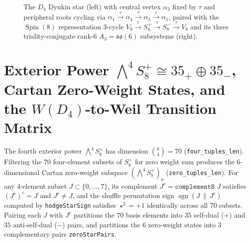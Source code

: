 \documentclass[11pt,a4paper]{article}
\begin{document}
\begin{figure}[htbp]
{%
  }
  \caption{The $D_4$ Dynkin star (left) with central vertex $\alpha_2$ fixed by $\tau$ and peripheral roots cycling via $\alpha_1 \xrightarrow{\tau} \alpha_4 \xrightarrow{\tau} \alpha_3 \xrightarrow{\tau} \alpha_1$, paired with the $\operatorname{Spin}(8)$ representation $3$-cycle $V_8 \xrightarrow{\tau} S^+_8 \xrightarrow{\tau} S^-_8 \xrightarrow{\tau} V_8$ and its three triality-conjugate rank-$6$ $A_3 = \mathfrak{so}(6)$ subsystems (right).}
  \label{fig:d4_dynkin_triality}
\end{figure}

\section{Exterior Power \texorpdfstring{$\bigwedge^4 S^+_8 \cong 35_+ \oplus 35_-$}{Wedge4(S+8) = 35+ + 35-}, Cartan Zero-Weight States, and the \texorpdfstring{$W(D_4)$}{W(D4)}-to-Weil Transition Matrix}

The fourth exterior power $\bigwedge^4 S^+_8$ has dimension $\binom{8}{4} = 70$ (\texttt{four\_tuples\_len}). Filtering the $70$ four-element subsets of $S^+_8$ for zero weight sum produces the $6$-dimensional Cartan zero-weight subspace $(\bigwedge^4 S^+_8)_0$ (\texttt{zero\_tuples\_len}). For any $4$-element subset $J \subset \{0, \dots, 7\}$, its complement $J^c = \texttt{complement8 } J$ satisfies $(J^c)^c = J$ and $J^c \neq J$, and the shuffle permutation sign $\operatorname{sgn}(J \,\|\, J^c)$ computed by \texttt{hodgeStarSign} satisfies $\star^2 = +1$ identically across all $70$ subsets. Pairing each $J$ with $J^c$ partitions the $70$ basis elements into $35$ self-dual ($+$) and $35$ anti-self-dual ($-$) pairs, and partitions the $6$ zero-weight states into $3$ complementary pairs \texttt{zeroStarPairs}.
\end{document}
